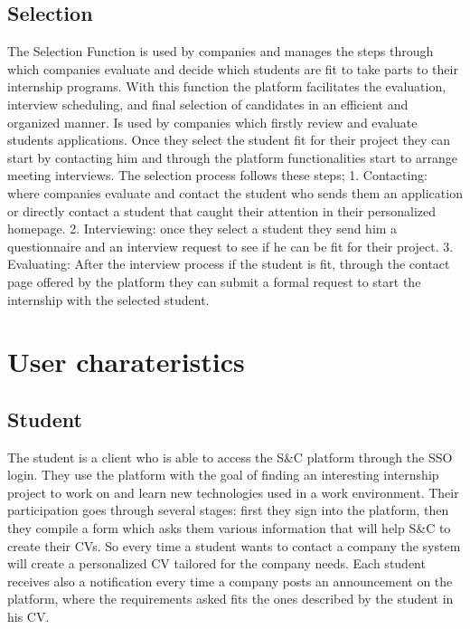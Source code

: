 \subsection{Selection}
The Selection Function is used by companies and manages the steps through which companies evaluate and decide which students are fit to take parts to their internship programs. With this function the platform facilitates the evaluation, interview scheduling, and final selection of candidates in an efficient and organized manner. Is used by companies which firstly review and evaluate students applications. Once they select the student fit for their project they can start by contacting him and through the platform functionalities start to arrange meeting interviews. 
The selection process follows these steps;
1.	Contacting: where companies evaluate and contact the student who sends them an application or directly contact a student that caught their attention in their personalized homepage.
2.	Interviewing: once they select a student they  send him a questionnaire and an interview request to see if he can be fit for their project. 
3. Evaluating: After the interview process if the student is fit, through the contact page offered by the platform they can submit a formal request to start the internship with the selected student.
\section{User charateristics}
\subsection{Student}
The student is a client who is able to access the S\&C platform through the SSO login. They use the platform with the goal of finding an interesting internship project to work on and learn new technologies used in a work environment. Their participation goes through several stages: first they sign into the platform, then they compile a form which asks them various information that will help S\&C to create their CVs. So every time a student wants to contact a company the system will create a personalized CV tailored for the company needs. Each student receives also a notification every time a company posts an announcement on the platform, where the requirements asked fits the ones described by the student in his CV.
